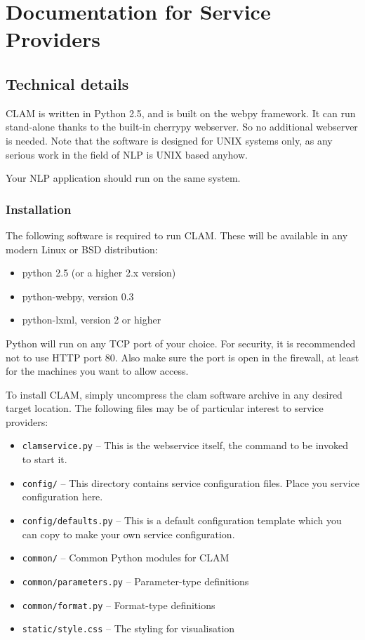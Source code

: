 \chapter{Documentation for Service Providers}

\section{Technical details}

CLAM is written in Python 2.5, and is built on the webpy framework. It can run stand-alone thanks to the built-in cherrypy webserver. So no additional webserver is needed. Note that the software is designed for UNIX systems only, as any serious work in the field of NLP is UNIX based anyhow. 

Your NLP application should run on the same system. 


\subsection{Installation}

The following software is required to run CLAM. These will be available in any modern Linux or BSD distribution:

\begin{itemize}
\item python 2.5 (or a higher 2.x version)
\item python-webpy, version 0.3
\item python-lxml, version 2 or higher
\end{itemize}

Python will run on any TCP port of your choice. For security, it is recommended not to use HTTP port 80. Also make sure the port is open in the firewall, at least for the machines you want to allow access.

To install CLAM, simply uncompress the clam software archive in any desired target location. The following files may be of particular interest to service providers:

\begin{itemize}
\item \texttt{clamservice.py} -- This is the webservice itself, the command to be invoked to start it.
\item \texttt{config/} -- This directory contains service configuration files. Place you service configuration here.
\item \texttt{config/defaults.py} -- This is a default configuration template which you can copy to make your own service configuration.
\item \texttt{common/} -- Common Python modules for CLAM
\item \texttt{common/parameters.py} -- Parameter-type definitions
\item \texttt{common/format.py} -- Format-type definitions
\item \texttt{static/style.css} -- The styling for visualisation

\end{itemize}

